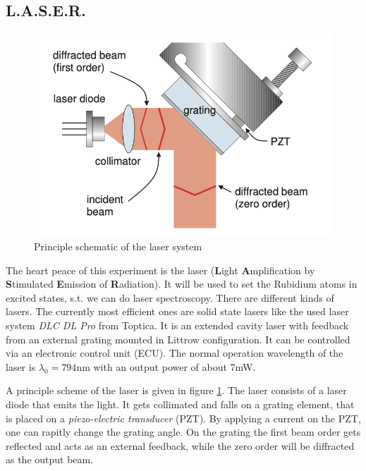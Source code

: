 \documentclass[11pt,a4paper,notitlepage]{scrartcl}
\begin{document}
\subsection{L.A.S.E.R.}
\begin{figure}
	\centering
	\includegraphics[width=\linewidth]{figs/experimental_setup/pzt.png}
	\caption{Principle schematic of the laser system \cite{manual}\label{fig:laser}}
\end{figure}
The heart peace of this experiment is the laser (\textbf{L}ight \textbf{A}mplification by \textbf{S}timulated \textbf{E}mission of \textbf{R}adiation). It will be used to set the Rubidium atoms in excited states, s.t. we can do laser spectroscopy. There are different kinds of lasers. The currently most efficient ones are solid state lasers like the used laser system \emph{DLC DL Pro} from Toptica. It is an extended cavity laser with feedback from an external grating mounted in Littrow configuration. It can be controlled via an electronic control unit (ECU). The normal operation wavelength of the laser is $\lambda_0=794$nm with an output power of about 7mW. \cite{manual}

A principle scheme of the laser is given in figure \ref{fig:laser}. The laser consists of a laser diode that emits the light. It gets collimated and falls on a grating element, that is placed on a \emph{piezo-electric transducer} (PZT). By applying a current on the PZT, one can rapitly change the grating angle. On the grating the first beam order gets reflected and acts as an external feedback, while the zero order will be diffracted as the output beam. \cite{manual}
\end{document}
